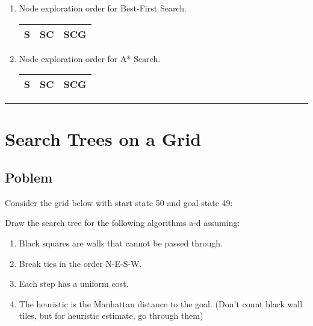 \documentclass[11pt]{article}
\begin{document}
\begin{flushleft}
\begin{enumerate}
    \item Node exploration order for Best-First Search.\\
        \begin{tabular}{| c | c | c |}
            \hline
            S & SC & SCG\\
            \hline
        \end{tabular}

    \item Node exploration order for A* Search.\\
        \begin{tabular}{| c | c | c |}
            \hline
            S & SC & SCG\\
            \hline
        \end{tabular}

\end{enumerate}


\hspace{1cm}
\hrule
\section*{Search Trees on a Grid}

\subsection*{Poblem}
Consider the grid below with start state 50 and goal state 49:

Draw the search tree for the following algorithms a-d assuming: 
\begin{enumerate}
    \item Black squares are walls that cannot be passed through. 
    \item Break ties in the order N-E-S-W.
    \item Each step has a uniform cost.
    \item The heuristic is the Manhattan distance to the goal. (Don’t count
        black wall tiles, but for heuristic estimate, go through them)
\end{enumerate}


\end{flushleft}
\end{document}

